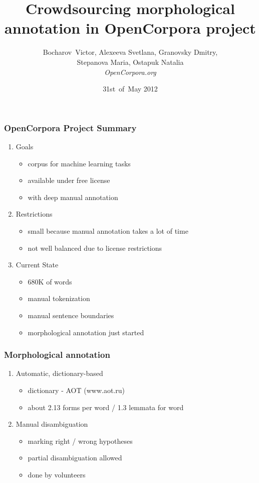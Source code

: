 \documentclass{beamer}
\title{Crowdsourcing morphological annotation in OpenCorpora project}
\author{Bocharov~Victor, Alexeeva Svetlana, Granovsky Dmitry,\\Stepanova Maria, Ostapuk Natalia\\\small\it OpenCorpora.org}
\date{31st~of~May 2012}
\begin{document}
\maketitle

\begin{frame}
\frametitle{OpenCorpora Project Summary}
\begin{enumerate}
\item{Goals}
    \begin{itemize}
    \item{corpus for machine learning tasks}
    \item{available under free license}
    \item{with deep manual annotation}
    \end{itemize}
    \pause
\item{Restrictions}
    \begin{itemize}
    \item{small because manual annotation takes a lot of time}
    \item{not well balanced due to license restrictions}
    \end{itemize}
    \pause
\item{Current State}
    \begin{itemize}
    \item{680K of words}
    \item{manual tokenization}
    \item{manual sentence boundaries}
    \item{morphological annotation just started}
    \end{itemize}
\end{enumerate}
\end{frame}

\begin{frame}
\frametitle{Morphological annotation}
\begin{enumerate}
\item{Automatic, dictionary-based}
    \begin{itemize}
    \item{dictionary - AOT (www.aot.ru)}
    \item{about 2.13 forms per word / 1.3 lemmata for word}
    \end{itemize}
\item{Manual disambiguation}
    \begin{itemize}
    \item{marking right / wrong hypotheses}
    \item{partial disambiguation allowed}
    \item{done by volunteers}
    \end{itemize}
\end{enumerate}
\end{frame}
\end{document}
